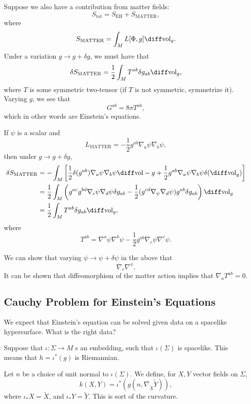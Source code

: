 \documentclass[12pt]{article}
\begin{document}
Suppose we also have a contribution from matter fields:
\[
S_{\mathrm{tot}} = S_{\mathrm{EH}} + S_{\mathrm{MATTER}},
\]
where
\[
	S_{\mathrm{MATTER}} = \int_M L[\Phi, g] \diff \mathrm{vol}_g.
\]
Under a variation $g \to g + \delta g$, we must have that
\[
\delta S_{\mathrm{MATTER}} = \frac 12 \int_M T^{ab} \delta g_{ab} \diff \mathrm{vol}_g,
\]
where $T$ is some symmetric two-tensor (if $T$ is not symmetric, symmetrize it). Varying $g$, we see that
\[
G^{ab} = 8 \pi T^{ab},
\]
which in other words are Einstein's equations.

\begin{exbox}
	If $\psi$ is a scalar and
	\[
	L_{\mathrm{MATTER}} = - \frac 12 g^{ab} \nabla_a \psi \nabla_b \psi,
	\]
	then under $g \to g + \delta g$,
	\begin{align*}
		\delta S_{\mathrm{MATTER}} &= - \int_M \left[ \frac 12 \delta(g^{ab}) \nabla_a \psi \nabla_b \psi \diff \mathrm{vol}-g + \frac 12 g^{ab} \nabla_a \psi \nabla_b \psi \delta(\diff \mathrm{vol}_g) \right] \\
					   &= \frac 12 \int_M \left( g^{ac} g^{bd} \nabla_c \psi \nabla_d \psi \delta g_{ab} - \frac 12 (g^{cd} \nabla_\psi \nabla_d \psi) g^{ab} \delta g_{ab} \right) \diff \mathrm{vol}_g \\
					   &= \frac 12 \int_M T^{ab} \delta g_{ab} \diff \mathrm{vol}_g,
	\end{align*}
	where
	\[
		T^{ab} = \nabla^a \psi \nabla^b \psi - \frac 12 g^{ab} \nabla_c \psi \nabla^c \psi.
	\]
\end{exbox}

We can show that varying $\psi \to \psi + \delta \psi$ in the above that
\[
\nabla_c \nabla^ \psi.
\]
It can be shown that diffeomorphism of the matter action implies that $\nabla_a T^{ab} = 0$.

\subsection{Cauchy Problem for Einstein's Equations}%
\label{sub:cpe}

We expect that Einstein's equation can be solved given data on a spacelike hypersurface. What is the right data?

Suppose that $\iota : \Sigma \to M$ 	s an embedding, such that $\iota(\Sigma)$ is spacelike. This means that $h= \iota^{\ast}(g)$ is Riemannian.

Let $n$ be a choice of unit normal to $\iota(\Sigma)$. We define, for $X, Y$ vector fields on $\Sigma$,
\[
k(X, Y) = \iota^{\ast} (g(n, \nabla_{\tilde X}\tilde Y)),
\]
where $\iota_\ast X = \tilde X$, and $\iota_\ast Y = \tilde Y$. This is sort of the curvature.
\end{document}
